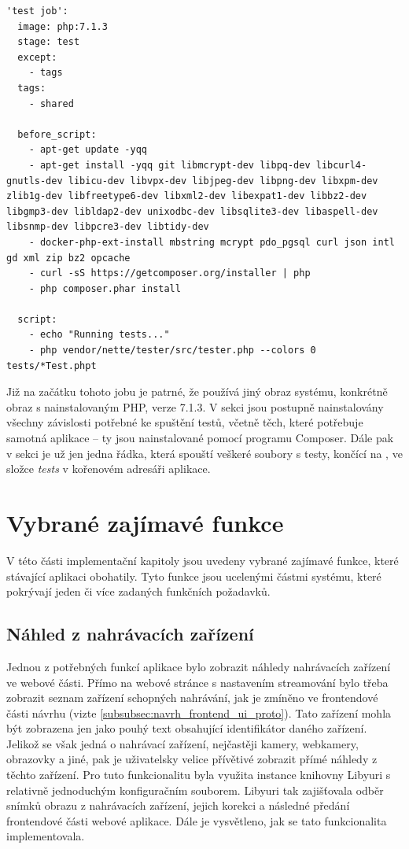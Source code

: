 \documentclass[thesis=M,czech]{FITthesis}[2012/06/26]
\begin{document}
\begin{lstlisting}[identifierstyle=\color{black}]
'test job':
  image: php:7.1.3
  stage: test
  except:
    - tags
  tags: 
    - shared

  before_script:
    - apt-get update -yqq
    - apt-get install -yqq git libmcrypt-dev libpq-dev libcurl4-gnutls-dev libicu-dev libvpx-dev libjpeg-dev libpng-dev libxpm-dev zlib1g-dev libfreetype6-dev libxml2-dev libexpat1-dev libbz2-dev libgmp3-dev libldap2-dev unixodbc-dev libsqlite3-dev libaspell-dev libsnmp-dev libpcre3-dev libtidy-dev
    - docker-php-ext-install mbstring mcrypt pdo_pgsql curl json intl gd xml zip bz2 opcache
    - curl -sS https://getcomposer.org/installer | php
    - php composer.phar install

  script:
    - echo "Running tests..."
    - php vendor/nette/tester/src/tester.php --colors 0 tests/*Test.phpt
\end{lstlisting}

Již na začátku tohoto jobu je patrné, že používá jiný obraz systému, konkrétně obraz s nainstalovaným PHP, verze 7.1.3. V sekci  jsou postupně nainstalovány všechny závislosti potřebné ke spuštění testů, včetně těch, které potřebuje samotná aplikace -- ty jsou nainstalované pomocí programu Composer. Dále pak v sekci  je už jen jedna řádka, která spouští veškeré soubory s testy, končící na , ve složce \textit{tests} v kořenovém adresáři aplikace.

\section{Vybrané zajímavé funkce} \label{sec:impl_funkce}
V této části implementační kapitoly jsou uvedeny vybrané zajímavé funkce, které stávající aplikaci obohatily. Tyto funkce jsou ucelenými částmi systému, které pokrývají jeden či více zadaných funkčních požadavků.

\subsection{Náhled z nahrávacích zařízení} \label{subsec:impl_funkce_preview}
Jednou z potřebných funkcí aplikace bylo zobrazit náhledy nahrávacích zařízení ve webové části. Přímo na webové stránce s nastavením streamování bylo třeba zobrazit seznam zařízení schopných nahrávání, jak je zmíněno ve frontendové části návrhu (vizte \ref{subsubsec:navrh_frontend_ui_proto}). Tato zařízení mohla být zobrazena jen jako pouhý text obsahující identifikátor daného zařízení. Jelikož se však jedná o nahrávací zařízení, nejčastěji kamery, webkamery, obrazovky a jiné, pak je uživatelsky velice přívětivé zobrazit přímé náhledy z těchto zařízení. Pro tuto funkcionalitu byla využita instance knihovny Libyuri s relativně jednoduchým konfiguračním souborem. Libyuri tak zajišťovala odběr snímků obrazu z nahrávacích zařízení, jejich korekci a následné předání frontendové části webové aplikace. Dále je vysvětleno, jak se tato funkcionalita implementovala. 
\end{document}
